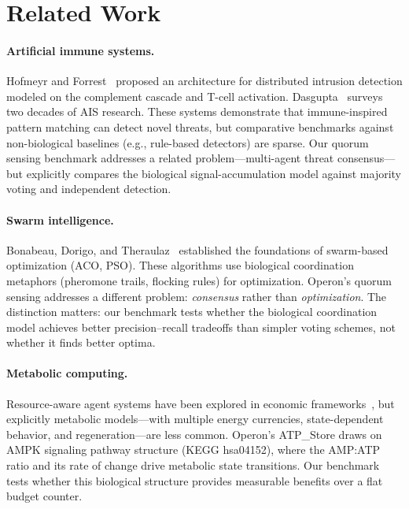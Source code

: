 \section{Related Work}\label{sec:related}

\paragraph{Artificial immune systems.}
Hofmeyr and Forrest~\cite{hofmeyr2000architecture} proposed an
architecture for distributed intrusion detection modeled on the
complement cascade and T-cell activation.  Dasgupta~\cite{dasgupta2006advances}
surveys two decades of AIS research.  These systems demonstrate that
immune-inspired pattern matching can detect novel threats, but
comparative benchmarks against non-biological baselines (e.g., rule-based
detectors) are sparse.  Our quorum sensing benchmark addresses a related
problem---multi-agent threat consensus---but explicitly compares the
biological signal-accumulation model against majority voting and
independent detection.

\paragraph{Swarm intelligence.}
Bonabeau, Dorigo, and Theraulaz~\cite{bonabeau1999swarm} established
the foundations of swarm-based optimization (ACO, PSO).  These
algorithms use biological coordination metaphors (pheromone trails,
flocking rules) for optimization.  Operon's quorum sensing addresses a
different problem: \emph{consensus} rather than \emph{optimization}.
The distinction matters: our benchmark tests whether the biological
coordination model achieves better precision--recall tradeoffs than
simpler voting schemes, not whether it finds better optima.

\paragraph{Metabolic computing.}
Resource-aware agent systems have been explored in economic
frameworks~\cite{wellman2001auction}, but explicitly metabolic models---with
multiple energy currencies, state-dependent behavior, and
regeneration---are less common.  Operon's ATP\_Store draws on AMPK
signaling pathway structure (KEGG hsa04152), where the AMP:ATP ratio
and its rate of change drive metabolic state transitions.  Our
benchmark tests whether this biological structure provides measurable
benefits over a flat budget counter.

